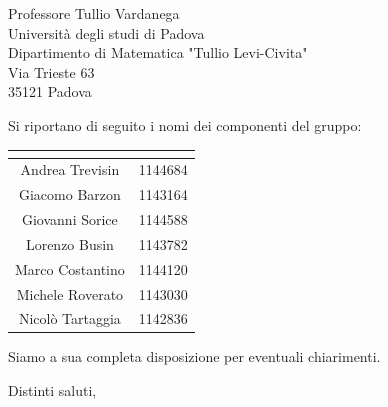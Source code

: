 \begin{letter}{Professore Tullio Vardanega \\ Università degli studi di Padova \\ Dipartimento di Matematica "Tullio Levi-Civita" \\ Via Trieste 63 \\ 35121 Padova}
\begin{addmargin}[2em]{2em}
  Si riportano di seguito i nomi dei componenti del gruppo:
\renewcommand{\arraystretch}{2}
\tabcolsep=16mm
	\begin{center}
		\begin{tabular}{| c | c |}
			\hline
			\rowcolor{title_row}
			\textbf{\color{title_text}{Nominativo}} & \textbf{\color{title_text}{Matricola}}\\ \hline
			Andrea Trevisin & 1144684\\ \hline
			Giacomo Barzon & 1143164\\ \hline
			Giovanni Sorice & 1144588\\ \hline
			Lorenzo Busin & 1143782\\ \hline
			Marco Costantino & 1144120\\ \hline
			Michele Roverato & 1143030\\ \hline
			Nicolò Tartaggia & 1142836\\ 
			\hline
		\end{tabular}
	\end{center}
\renewcommand{\arraystretch}{1}

Siamo a sua completa disposizione per eventuali chiarimenti.
\end{addmargin}

\closing{Distinti saluti,}




\end{letter}
 

